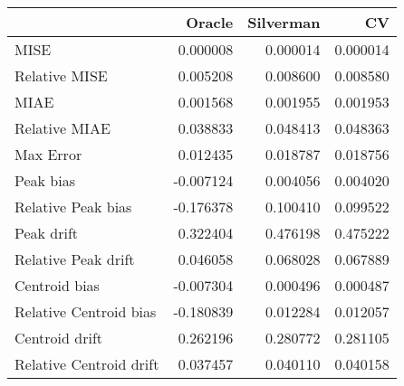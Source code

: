 \begin{tabular}{lrrr}
  \hline
 & Oracle & Silverman & CV \\ 
  \hline
MISE & 0.000008 & 0.000014 & 0.000014 \\ 
  Relative MISE & 0.005208 & 0.008600 & 0.008580 \\ 
  MIAE & 0.001568 & 0.001955 & 0.001953 \\ 
  Relative MIAE & 0.038833 & 0.048413 & 0.048363 \\ 
  Max Error & 0.012435 & 0.018787 & 0.018756 \\ 
  Peak bias & -0.007124 & 0.004056 & 0.004020 \\ 
  Relative Peak bias & -0.176378 & 0.100410 & 0.099522 \\ 
  Peak drift & 0.322404 & 0.476198 & 0.475222 \\ 
  Relative Peak drift & 0.046058 & 0.068028 & 0.067889 \\ 
  Centroid bias & -0.007304 & 0.000496 & 0.000487 \\ 
  Relative Centroid bias & -0.180839 & 0.012284 & 0.012057 \\ 
  Centroid drift & 0.262196 & 0.280772 & 0.281105 \\ 
  Relative Centroid drift & 0.037457 & 0.040110 & 0.040158 \\ 
   \hline
\end{tabular}
